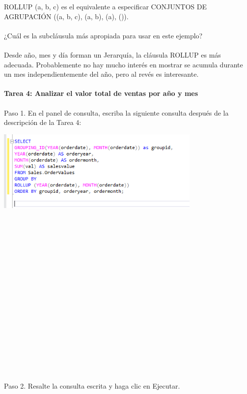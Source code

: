 \begin{flushleft}
ROLLUP (a, b, c) es el equivalente a especificar CONJUNTOS DE AGRUPACIÓN ((a, b, c), (a, b), (a), ()).
\textbf{}\\
\textbf{}\\
¿Cuál es la subcláusula más apropiada para usar en este ejemplo?
\textbf{}\\
\textbf{}\\
 Desde año, mes y día forman un Jerarquía, la cláusula ROLLUP es más adecuada. Probablemente no hay mucho interés en mostrar se acumula durante un mes independientemente del año, pero al revés es interesante.
\textbf{}\\
\textbf{}\\
\textbf{Tarea 4: Analizar el valor total de ventas por año y mes}
\textbf{}\\
\textbf{}\\
Paso 1. En el panel de consulta, escriba la siguiente consulta después de la descripción de la Tarea 4:
\begin{center}
	\includegraphics[width=10cm]{./Imagenes/6img7} 
	\end{center}
\textbf{}\\
\textbf{}\\
\textbf{}\\
\textbf{}\\
\textbf{}\\
\textbf{}\\
\textbf{}\\
\textbf{}\\
\textbf{}\\
\textbf{}\\
\textbf{}\\
\textbf{}\\
\textbf{}\\
\textbf{}\\
\textbf{}\\
\textbf{}\\
\textbf{}\\
Paso 2. Resalte la consulta escrita y haga clic en Ejecutar.
\begin{center}

\end{center}
\end{flushleft}
